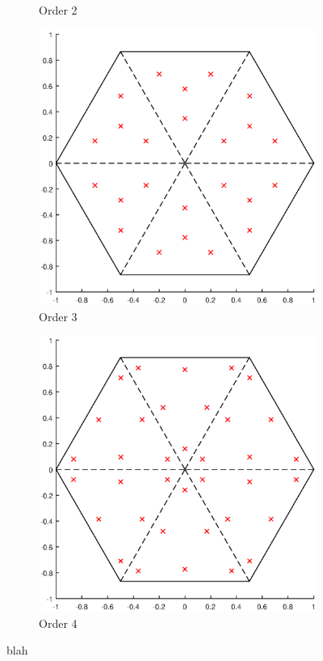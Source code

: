 \begin{figure}
{\begin{subfigure}[b]{0.475\textwidth}
		\caption{Order 2}
	\end{subfigure}
}
\vspace{3mm}
{
	\begin{subfigure}[b]{0.475\textwidth}
		\centering
		\label{subfig::2DInt_V6_Q3}
		\includegraphics[width=\textwidth]{figures/sec_BF/V6_Q3.eps}
		\caption{Order 3}
	\end{subfigure}
	\hfill
	\begin{subfigure}[b]{0.475\textwidth}
		\centering
		\label{subfig::2DInt_V6_Q4}
		\includegraphics[width=\textwidth]{figures/sec_BF/V6_Q4.eps}
		\caption{Order 4}
	\end{subfigure}
}
\caption{blah}
\label{fig::BF_2DIntegration_Hexagon}
\end{figure}

